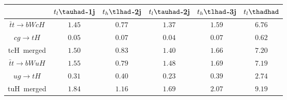 \centering
\begin{tabular}{|c|c|c|c|c|c|} \hline
 & $t_{l}\tauhad$-1j & $t_{h}\tlhad$-2j & $t_{l}\tauhad$-2j & $t_{h}\tlhad$-3j & $t_{l}\thadhad$\\\hline
$\bar{t}t\to bWcH$ & $1.45$ & $0.77$ & $1.37$ & $1.59$ & $6.76$\\\hline
$cg\to tH$ & $0.05$ & $0.07$ & $0.04$ & $0.07$ & $0.62$\\\hline
tcH~merged & $1.50$ & $0.83$ & $1.40$ & $1.66$ & $7.20$\\\hline
$\bar{t}t\to bWuH$ & $1.55$ & $0.79$ & $1.48$ & $1.69$ & $7.19$\\\hline
$ug\to tH$ & $0.31$ & $0.40$ & $0.23$ & $0.39$ & $2.74$\\\hline
tuH~merged & $1.84$ & $1.16$ & $1.69$ & $2.07$ & $9.19$\\\hline
\end{tabular}

